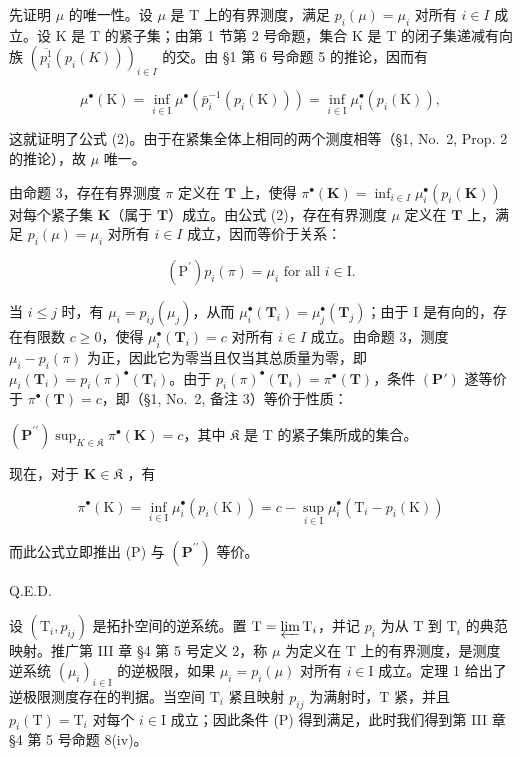 先证明 \(\mu\) 的唯一性。设 \(\mu\) 是 T 上的有界测度，满足 \(p_i(\mu) = \mu_i\) 对所有 \(i \in I\) 成立。设 K 是 T 的紧子集；由第 1 节第 2 号命题，集合 K 是 T 的闭子集递减有向族 \(\left(\overline{p_i^1}(p_i(K))\right)_{i \in I}\) 的交。由 §1 第 6 号命题 5 的推论，因而有

\[
\mu^ {\bullet} (\mathrm{K}) = \inf _ {i \in \mathrm{I}} \mu^ {\bullet} \left(\bar {p} _ {i} ^ {- 1} (p _ {i} (\mathrm{K}))\right) = \inf _ {i \in \mathrm{I}} \mu_ {i} ^ {\bullet} \left(p _ {i} (\mathrm{K})\right),
\]

这就证明了公式 (2)。由于在紧集全体上相同的两个测度相等（§1, No.~2, Prop. 2 的推论），故 \(\mu\) 唯一。

由命题 3，存在有界测度 \(\pi\) 定义在 \(\mathbf{T}\) 上，使得 \(\pi^{\bullet}(\mathbf{K}) = \inf_{i\in I}\mu_i^\bullet (p_i(\mathbf{K}))\) 对每个紧子集 \(\mathbf{K}\)（属于 \(\mathbf{T}\)）成立。由公式 (2)，存在有界测度 \(\mu\) 定义在 \(\mathbf{T}\) 上，满足 \(p_i(\mu) = \mu_i\) 对所有 \(i\in I\) 成立，因而等价于关系：

\[
\left(\mathrm{P} ^ {\prime}\right) p _ {i} (\pi) = \mu_ {i} \text { for all } i \in \mathrm{I}.
\]

当 \(i \leqslant j\) 时，有 \(\mu_i = p_{ij}(\mu_j)\)，从而 \(\mu_i^\bullet (\mathbf{T}_i) = \mu_j^\bullet (\mathbf{T}_j)\)；由于 I 是有向的，存在有限数 \(c \geqslant 0\)，使得 \(\mu_i^\bullet (\mathbf{T}_i) = c\) 对所有 \(i \in I\) 成立。由命题 3，测度 \(\mu_i - p_i(\pi)\) 为正，因此它为零当且仅当其总质量为零，即 \(\mu_i(\mathbf{T}_i) = p_i(\pi)^\bullet (\mathbf{T}_i)\)。由于 \(p_i(\pi)^\bullet (\mathbf{T}_i) = \pi^\bullet (\mathbf{T})\)，条件 \((\mathbf{P}')\) 遂等价于 \(\pi^\bullet (\mathbf{T}) = c\)，即（§1, No.~2, 备注 3）等价于性质：

\((\mathbf{P}^{\prime \prime})\sup_{K\in \mathfrak{K}}\pi^{\bullet}(\mathbf{K}) = c\)，其中 \(\mathfrak{K}\) 是 T 的紧子集所成的集合。

现在，对于 \(\mathbf{K} \in \mathfrak{K}\) ，有

\[
\pi^ {\bullet} (\mathrm{K}) = \inf _ {i \in \mathrm{I}} \mu_ {i} ^ {\bullet} (p _ {i} (\mathrm{K})) = c - \sup _ {i \in \mathrm{I}} \mu_ {i} ^ {\bullet} (\mathrm{T} _ {i} - p _ {i} (\mathrm{K}))
\]

而此公式立即推出 (P) 与 \((\mathbf{P}^{\prime \prime})\) 等价。

Q.E.D.

设 \((\mathrm{T}_{i}, p_{ij})\) 是拓扑空间的逆系统。置 \(\mathrm{T} = \varprojlim \mathrm{T}_{i}\)，并记 \(p_{i}\) 为从 \(\mathrm{T}\) 到 \(\mathrm{T}_{i}\) 的典范映射。推广第 III 章 §4 第 5 号定义 2，称 \(\mu\) 为定义在 \(\mathrm{T}\) 上的有界测度，是测度逆系统 \((\mu_{i})_{i \in \mathrm{I}}\) 的逆极限，如果 \(\mu_{i} = p_{i}(\mu)\) 对所有 \(i \in \mathrm{I}\) 成立。定理 1 给出了逆极限测度存在的判据。当空间 \(\mathrm{T}_{i}\) 紧且映射 \(p_{ij}\) 为满射时，\(\mathrm{T}\) 紧，并且 \(p_{i}(\mathrm{T}) = \mathrm{T}_{i}\) 对每个 \(i \in \mathrm{I}\) 成立；因此条件 (P) 得到满足，此时我们得到第 III 章 §4 第 5 号命题 8(iv)。


